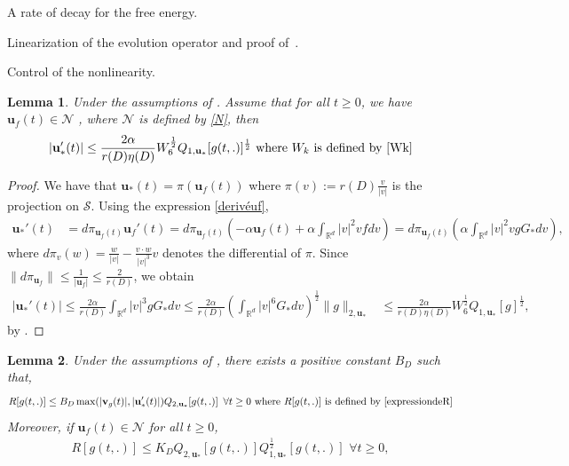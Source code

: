 \documentclass[reqno]{amsart} %
\newtheorem{lemma}{Lemma}[section]
\begin{document}
\begin{section}{A rate of decay for the free energy.}
\begin{section}{Linearization of the evolution operator and proof of~\texorpdfstring{}{thm3}.}
\begin{subsection}{Control of the nonlinearity.}
\begin{lemma}
\label{contoleJ_*}
 Under the assumptions of  . Assume that for all $t\geq 0$, we have $\mathbf{u}_{f}(t) \in \mathcal{N}$ , where $\mathcal{N}$ is defined by \eqref{N}, then
    \begin{align*}
        |\mathbf{u}_*'(t)| \leq \frac{2 \alpha }{r(D)\eta(D)}W_6^\frac{1}{2} Q_{1,\mathbf{u}_*}[g(t,.)]^\frac{1}{2} \text{ where } W_k  \text{ is defined by \eqref{Wk}}
    \end{align*}
\end{lemma}
\begin{proof}
    We have that $\mathbf{u}_*(t)= \pi(\mathbf{u}_{f}(t))$ where $\pi(v):= r(D) \frac{v}{|v|}$ is the projection on $\mathcal{S}$. Using the expression \eqref{derivéuf}, 
\begin{align*}
    \mathbf{u}_*'(t)&= d\pi_{\mathbf{u}_{f}(t)}\mathbf{u}_{f}'(t)
    = d\pi_{\mathbf{u}_{f}(t)}\left(- \alpha \mathbf{u}_{f}(t)+ \alpha \int_{\mathbb{R}^d}|v|^2vfdv \right)
    = d\pi_{\mathbf{u}_{f}(t)}\left(\alpha \int_{\mathbb{R}^d}|v|^2vgG_{*}dv\right),
\end{align*}
where $d\pi_v(w)=\frac{w}{|v|}-\frac{v\cdot w}{|v|^3}v$ denotes the differential of $\pi$. Since $\lVert d\pi_{\mathbf{u}_{f}}\rVert\leq \frac{1}{|\mathbf{u}_{f}|} \leq \frac{2}{r(D)}$, we obtain
\begin{align*}
    |\mathbf{u}_*'(t)| \leq \frac{2 \alpha }{r(D)} \int_{\mathbb{R}^d}|v|^3gG_{*}dv \leq  \frac{2 \alpha }{r(D)} \left(\int_{\mathbb{R}^d}|v|^6G_{*}dv\right)^\frac{1}{2} \lVert g \rVert_{2,\mathbf{u}_*}
    &\leq  \frac{2 \alpha }{r(D)\eta(D)}W_6^\frac{1}{2} Q_{1,\mathbf{u}_*}[g]^\frac{1}{2},
\end{align*}
by .
\end{proof}
\begin{lemma}
\label{controlereste1} Under the assumptions of , there exists a positive constant $B_D$ such that,
    \begin{align}
    \label{eq45}
        R[g(t,.)] \leq B_D \max(|\mathbf{v}_g(t)|,|\mathbf{u}_*'(t)|)Q_{2,\mathbf{u}_*}[g(t,.)] \,\, \, \forall t\geq0 \text{  where  } R[g(t,.)] \text{ is defined by } \eqref{expressiondeR} 
    \end{align}
Moreover, if $\mathbf{u}_{f}(t) \in \mathcal{N}$ for all $t\geq 0$, 
\begin{align}
    \label{controlereste} 
        R[g(t,.)] \leq K_D Q_{2,\mathbf{u}_*}[g(t,.)]Q_{1,\mathbf{u}_*}^{\frac{1}{2}}[g(t,.)]  \,\, \forall t\geq 0,
    \end{align}

\end{lemma}
\end{subsection}
\end{section}
\end{section}
\end{document}
